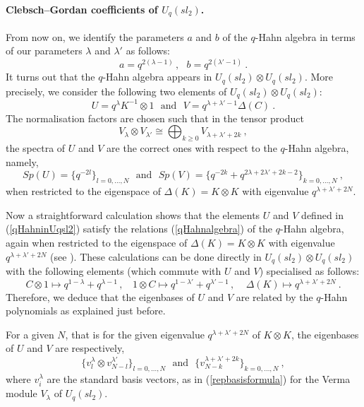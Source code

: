 \documentclass[a4paper,12pt]{article}
\numberwithin{equation}{section}
\newcommand{\la}{\lambda}
\theoremstyle{rem}
\theoremstyle{definition}
\begin{document}
\paragraph{Clebsch--Gordan coefficients of $U_q(sl_2)$.} From now on, we identify the parameters $a$ and $b$ of the $q$-Hahn algebra in terms of our parameters $\lambda$ and $\lambda'$ as follows:
\begin{equation}\label{param_qHahn}
a=q^{2(\la-1)}\,,\ \ \ b=q^{2(\la'-1)}\ .
\end{equation} 
It turns out that the $q$-Hahn algebra appears in $U_q(sl_2)\otimes U_q(sl_2)$. More precisely, we consider the following two elements of $U_q(sl_2)\otimes U_q(sl_2)$:
\begin{equation}\label{qHahninUqsl2}
U=q^{\lambda}K^{-1}\otimes 1\ \ \ \text{and}\ \ \ V=q^{\lambda+\lambda'-1}\Delta(C)\ .\end{equation}
The normalisation factors are chosen such that in the tensor product
\[V_{\lambda}\otimes V_{\lambda'}\cong\bigoplus_{k\geq0} V_{\lambda+\lambda'+2k}\ ,\]
the spectra of $U$ and $V$ are the correct ones with respect to the $q$-Hahn algebra, namely,
\[Sp(U)=\{q^{-2l}\}_{l=0,\dots,N}\ \ \ \text{and}\ \ \ Sp(V)=\{q^{-2k}+q^{2\lambda+2\lambda'+2k-2}\}_{k=0,\dots,N}\ ,\]
when restricted to the eigenspace of $\Delta(K)=K\otimes K$ with eigenvalue $q^{\lambda+\lambda'+2N}$.

Now a straightforward calculation shows that the elements $U$ and $V$ defined in (\ref{qHahninUqsl2}) satisfy the relations (\ref{qHahnalgebra}) of the $q$-Hahn algebra, again when restricted to the eigenspace of $\Delta(K)=K\otimes K$ with eigenvalue $q^{\lambda+\lambda'+2N}$ (see \cite{Huang18}). These calculations can be done directly in $U_q(sl_2)\otimes U_q(sl_2)$ with the following elements (which commute with $U$ and $V$) specialised as follows:
\[C\otimes 1\mapsto q^{1-\lambda}+q^{\lambda-1}\,,\ \ \ \ 1\otimes C\mapsto q^{1-\lambda'}+q^{\lambda'-1}\,,\ \ \ \ \ \Delta(K)\mapsto q^{\lambda+\lambda'+2N}\ .\]
Therefore, we deduce that the eigenbases of $U$ and $V$ are related by the $q$-Hahn polynomials as explained just before. 

For a given $N$, that is for the given eigenvalue $q^{\lambda+\lambda'+2N}$ of $K\otimes K$, the eigenbases of $U$ and $V$ are respectively,
\begin{equation}\label{twobasis}\{v^{\lambda}_l\otimes v^{\lambda'}_{N-l}\}_{l=0,\dots,N}\ \ \ \text{and}\ \ \ \{v^{\lambda+\lambda'+2k}_{N-k}\}_{k=0,\dots,N}\ ,\end{equation}
where $v^{\lambda}_i$ are the standard basis vectors, as in (\ref{repbasisformula}) for the Verma module $V_{\lambda}$ of $U_q(sl_2)$.
\end{document}
